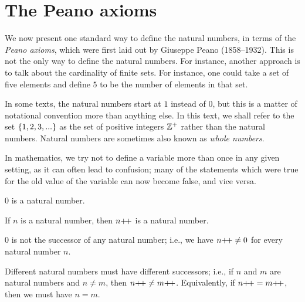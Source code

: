 \section{The Peano axioms}\label{i:sec:2.1}

\begin{note}
  We now present one standard way to define the natural numbers, in terms of the \emph{Peano axioms}, which were first laid out by Giuseppe Peano (1858--1932).
  This is not the only way to define the natural numbers.
  For instance, another approach is to talk about the cardinality of finite sets.
  For instance, one could take a set of five elements and define \(5\) to be the number of elements in that set.
\end{note}

\begin{note}
  In some texts, the natural numbers start at \(1\) instead of \(0\), but this is a matter of notational convention more than anything else.
  In this text, we shall refer to the set \(\left\lbrace1, 2, 3,...\right\rbrace\) as the set of positive integers \(\mathbb{Z}^+\) rather than the natural numbers.
  Natural numbers are sometimes also known as \emph{whole numbers}.
\end{note}

\begin{note}
  In mathematics, we try not to define a variable more than once in any given setting, as it can often lead to confusion;
  many of the statements which were true for the old value of the variable can now become false, and vice versa.
\end{note}

\begin{ax}\label{i:2.1}
  \(0\) is a natural number.
\end{ax}

\begin{ax}\label{i:2.2}
  If \(n\) is a natural number, then \(n{+}\!{+}\) is a natural number.
\end{ax}

\begin{ax}\label{i:2.3}
  \(0\) is not the successor of any natural number;
  i.e., we have \(n{+}\!{+} \neq 0\) for every natural number \(n\).
\end{ax}

\begin{ax}\label{i:2.4}
  Different natural numbers must have different successors;
  i.e., if \(n\) and \(m\) are natural numbers and \(n \neq m\), then \(n{+}\!{+} \neq m{+}\!{+}\).
  Equivalently, if \(n{+}\!{+} = m{+}\!{+}\), then we must have \(n = m\).
\end{ax}

